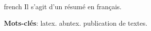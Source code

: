 \begin{resumo}[Résumé]
 \begin{otherlanguage*}{french}
    Il s'agit d'un résumé en français.
 
   \textbf{Mots-clés}: latex. abntex. publication de textes.  %
 \end{otherlanguage*}
\end{resumo}